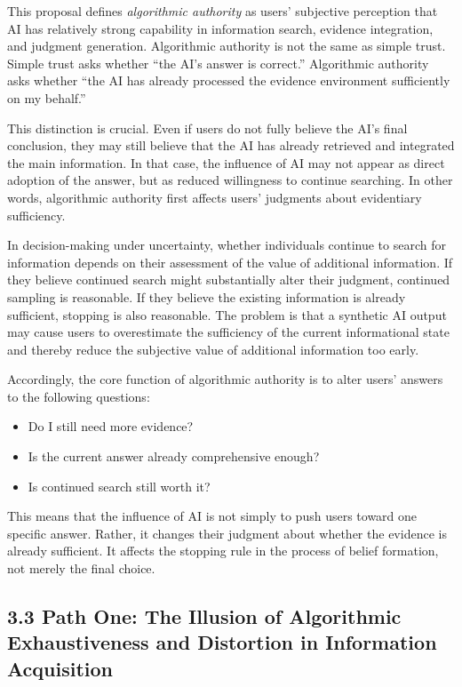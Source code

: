 This proposal defines \emph{algorithmic authority} as users' subjective perception that AI has relatively strong capability in information search, evidence integration, and judgment generation. Algorithmic authority is not the same as simple trust. Simple trust asks whether ``the AI's answer is correct.'' Algorithmic authority asks whether ``the AI has already processed the evidence environment sufficiently on my behalf.''

This distinction is crucial. Even if users do not fully believe the AI's final conclusion, they may still believe that the AI has already retrieved and integrated the main information. In that case, the influence of AI may not appear as direct adoption of the answer, but as reduced willingness to continue searching. In other words, algorithmic authority first affects users' judgments about evidentiary sufficiency.

In decision-making under uncertainty, whether individuals continue to search for information depends on their assessment of the value of additional information. If they believe continued search might substantially alter their judgment, continued sampling is reasonable. If they believe the existing information is already sufficient, stopping is also reasonable. The problem is that a synthetic AI output may cause users to overestimate the sufficiency of the current informational state and thereby reduce the subjective value of additional information too early.

Accordingly, the core function of algorithmic authority is to alter users' answers to the following questions:
\begin{itemize}[leftmargin=1.5em]
\item Do I still need more evidence?
\item Is the current answer already comprehensive enough?
\item Is continued search still worth it?
\end{itemize}

This means that the influence of AI is not simply to push users toward one specific answer. Rather, it changes their judgment about whether the evidence is already sufficient. It affects the stopping rule in the process of belief formation, not merely the final choice.

\subsection*{3.3 Path One: The Illusion of Algorithmic Exhaustiveness and Distortion in Information Acquisition}

